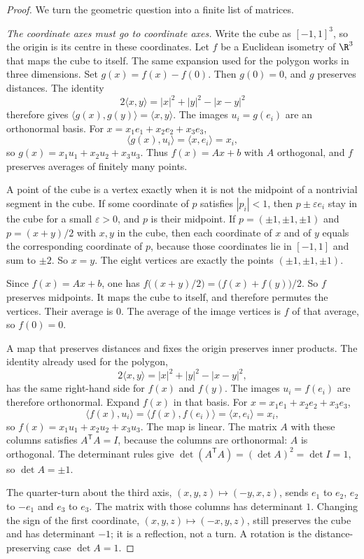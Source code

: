 \begin{proof}
We turn the geometric question into a finite list of matrices.

\emph{The coordinate axes must go to coordinate axes.}
Write the cube as $[-1,1]^3$, so the origin is its centre in these coordinates. Let $f$ be a Euclidean isometry of $\R^3$ that maps the cube to itself. The same expansion used for the polygon works in three dimensions. Set $g(x)=f(x)-f(0)$. Then $g(0)=0$, and $g$ preserves distances. The identity
\[
2\langle x,y\rangle=|x|^2+|y|^2-|x-y|^2
\]
therefore gives $\langle g(x),g(y)\rangle=\langle x,y\rangle$. The images $u_i=g(e_i)$ are an orthonormal basis. For $x=x_1e_1+x_2e_2+x_3e_3$,
\[
\langle g(x),u_i\rangle=\langle x,e_i\rangle=x_i,
\]
so $g(x)=x_1u_1+x_2u_2+x_3u_3$. Thus $f(x)=Ax+b$ with $A$ orthogonal, and $f$ preserves averages of finitely many points.

A point of the cube is a vertex exactly when it is not the midpoint of a nontrivial segment in the cube. If some coordinate of $p$ satisfies $|p_i|<1$, then $p\pm\varepsilon e_i$ stay in the cube for a small $\varepsilon>0$, and $p$ is their midpoint. If $p=(\pm1,\pm1,\pm1)$ and $p=(x+y)/2$ with $x,y$ in the cube, then each coordinate of $x$ and of $y$ equals the corresponding coordinate of $p$, because those coordinates lie in $[-1,1]$ and sum to $\pm2$. So $x=y$. The eight vertices are exactly the points $(\pm1,\pm1,\pm1)$.

Since $f(x)=Ax+b$, one has $f\bigl((x+y)/2\bigr)=\bigl(f(x)+f(y)\bigr)/2$. So $f$ preserves midpoints. It maps the cube to itself, and therefore permutes the vertices. Their average is $0$. The average of the image vertices is $f$ of that average, so $f(0)=0$.

A map that preserves distances and fixes the origin preserves inner products. The identity already used for the polygon,
\[
2\langle x,y\rangle=|x|^2+|y|^2-|x-y|^2,
\]
has the same right-hand side for $f(x)$ and $f(y)$. The images $u_i=f(e_i)$ are therefore orthonormal. Expand $f(x)$ in that basis. For $x=x_1e_1+x_2e_2+x_3e_3$,
\[
\langle f(x),u_i\rangle=\langle f(x),f(e_i)\rangle=\langle x,e_i\rangle=x_i,
\]
so $f(x)=x_1u_1+x_2u_2+x_3u_3$. The map is linear. The matrix $A$ with these columns satisfies $A^{\mathsf T}A=I$, because the columns are orthonormal: $A$ is orthogonal. The determinant rules give $\det(A^{\mathsf T}A)=(\det A)^2=\det I=1$, so $\det A=\pm1$.

The quarter-turn about the third axis, $(x,y,z)\mapsto(-y,x,z)$, sends $e_1$ to $e_2$, $e_2$ to $-e_1$ and $e_3$ to $e_3$. The matrix with those columns has determinant $1$. Changing the sign of the first coordinate, $(x,y,z)\mapsto(-x,y,z)$, still preserves the cube and has determinant $-1$; it is a reflection, not a turn. A rotation is the distance-preserving case $\det A=1$.


\end{proof}

